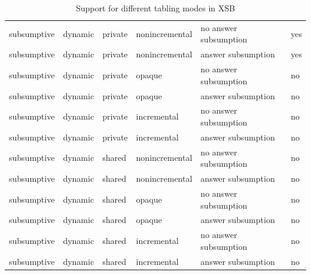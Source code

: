 \begin{table}
\begin{center}
{\begin{tabular}{llllll}
subsumptive &	    dynamic &	   private &	  nonincremental &      no answer subsumption &	yes \\
subsumptive &	    dynamic &	   private &	  nonincremental &      answer subsumption &	yes \\
subsumptive &	    dynamic &	   private &	  opaque &	      no answer subsumption &	no \\
subsumptive &	    dynamic &	   private &	  opaque &	      answer subsumption &	no \\
subsumptive &	    dynamic &	   private &	  incremental &         no answer subsumption &	no \\
subsumptive &	    dynamic &	   private &   	  incremental &         answer subsumption &	no \\
subsumptive &	    dynamic &	   shared &	  nonincremental &      no answer subsumption &	no \\
subsumptive &	    dynamic &	   shared &	  nonincremental &      answer subsumption &	no \\
subsumptive &	    dynamic &	   shared &	  opaque &	      no answer subsumption &	no \\
subsumptive &	    dynamic &	   shared &	  opaque &	      answer subsumption &	no \\
subsumptive &	    dynamic &	   shared &	  incremental &         no answer subsumption &	no \\
subsumptive &  	    dynamic &	   shared &	  incremental &         answer subsumption &	no \\ \hline \hline 
\end{tabular}
}
\end{center}
\caption{Support for different tabling modes in XSB \version}
\label{table:table}
\end{table}

